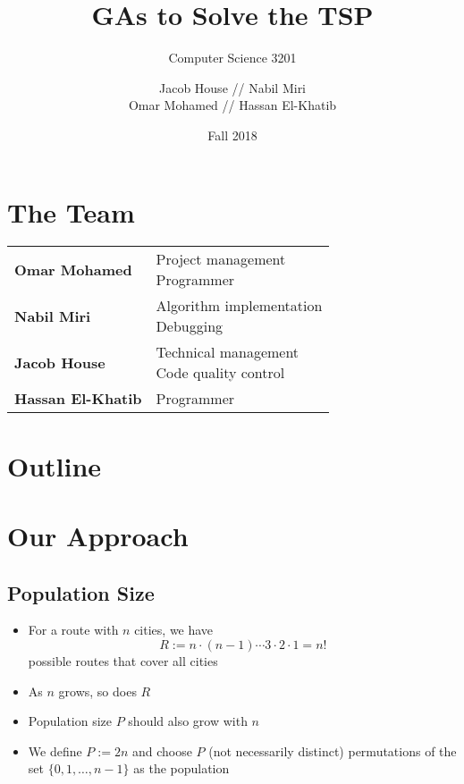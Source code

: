 \documentclass[xcolor={usenames,dvipsnames,svgnames}]{beamer}
\title{GAs to Solve the TSP}
\subtitle{Computer Science 3201}
\author{Jacob House // Nabil Miri \\ Omar Mohamed // Hassan El-Khatib}
\date{Fall 2018}
\begin{document}
\begin{frame}[plain]
\titlepage
\end{frame}

\startheads

\section*{The Team}
\begin{frame}
\def\arraystretch{2}%
\begin{tabular}{>{\color{structure}\bfseries}ll}
	Omar Mohamed & \parbox[t]{.75\linewidth}{Project management \\ Programmer} \\
	Nabil Miri & \parbox[t]{.75\linewidth}{Algorithm implementation \\ Debugging} \\
	Jacob House & \parbox[t]{.75\linewidth}{Technical management \\ Code quality control} \\
	Hassan El-Khatib & Programmer
\end{tabular}
\end{frame}

\section*{Outline}
\begin{frame}
\tableofcontents
\end{frame}

\section{Our Approach}
\subsection{Population Size}
\begin{frame}
\begin{itemize}
	\item<1-> For a route with $n$ cities, we have
	\begin{equation*}
	R := n \cdot (n-1) \cdots 3 \cdot 2 \cdot 1 = n!
	\end{equation*}
	possible routes that cover all cities
	\item<2-> As $n$ grows, so does $R$
	\item<3-> Population size $P$ should also grow with $n$
	\item<4-> We define $P := 2n$ and choose $P$ (not necessarily distinct) permutations of the set $\{0, 1, \ldots, n-1\}$ as the population
\end{itemize}
\end{frame}
\end{document}

